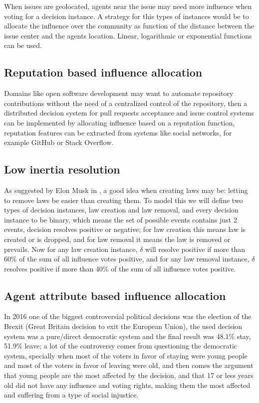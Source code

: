 When issues are geolocated, agents near the issue may need more influence when voting for a decision instance. A strategy for this types of instances would be to allocate the influence over the community as function of the distance between the issue center and the agents location. Linear, logarithmic or exponential functions can be used.

\subsection{Reputation based influence allocation}

Domains like open software development may want to automate repository contributions without the need of a centralized control of the repository, then a distributed decision system for pull requests acceptance and issue control systems can be implemented by allocating influence based on a reputation function, reputation features can be extracted from systems like social networks, for example GitHub or Stack Overflow.

\subsection{Low inertia resolution}

As suggested by Elon Musk in \cite{lowinertia}, a good idea when creating laws may be: letting to remove laws be easier than creating them. To model this we will define two types of decision instances, law creation and law removal, and every decision instance to be binary, which means the set of possible events contains just 2 events, decision resolves positive or negative; for law creation this means law is created or is dropped, and for law removal it means the law is removed or prevails. Now for any law creation instance, $\delta$ will resolve positive if more than 60\% of the sum of all influence votes positive, and for any law removal instance, $\delta$ resolves positive if more than 40\% of the sum of all influence votes positive. 

\subsection{Agent attribute based influence allocation}

In 2016 one of the biggest controversial political decisions was the election of the Brexit (Great Britain decision to exit the European Union), the used decision system was a pure/direct democratic system and the final result was 48.1\% stay, 51.9\% leave; a lot of the controversy comes from questioning the democratic system, specially when most of the voters in favor of staying were young people and most of the voters in favor of leaving were old, and then comes the argument that young people are the most affected by the decision, and that 17 or less years old did not have any influence and voting rights, making them the most affected and suffering from a type of social injustice. 

